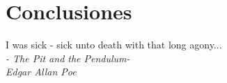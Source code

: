 \chapter{Conclusiones}
\begin{flushright} 
I was sick - sick unto death with that long agony...\\
\emph{- The Pit and the Pendulum-}\\
\emph{Edgar Allan Poe}
\end{flushright}

